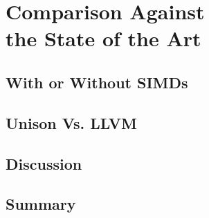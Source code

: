 %

\chapter[Comparison Against the State of the Art]%
        {Comparison Against\\ the State of the Art}

\section{With or Without SIMDs}
\section{Unison Vs. LLVM}
\section{Discussion}
\section{Summary}
